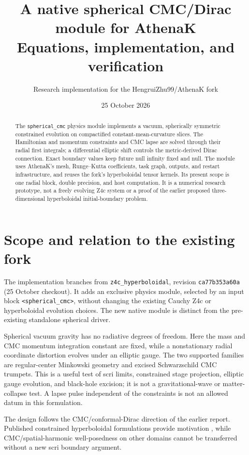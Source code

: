 \documentclass[11pt]{article}
\title{A native spherical CMC/Dirac module for AthenaK\\\large Equations, implementation, and verification}
\author{Research implementation for the HengruiZhu99/AthenaK fork}
\date{25 October 2026}
\begin{document}
\maketitle
\begin{abstract}
The \texttt{spherical\_cmc} physics module implements a vacuum, spherically
symmetric constrained evolution on compactified constant-mean-curvature slices.
The Hamiltonian and momentum constraints and CMC lapse are solved through their
radial first integrals; a differential elliptic shift controls the metric-derived
Dirac connection. Exact boundary values keep future null infinity fixed and null.
The module uses AthenaK's mesh, Runge--Kutta coefficients, task graph, outputs,
and restart infrastructure, and reuses the fork's hyperboloidal tensor kernels.
Its present scope is one radial block, double precision, and host computation.
It is a numerical research prototype, not a freely evolving Z4c system or a proof
of the earlier proposed three-dimensional hyperboloidal initial-boundary problem.
\end{abstract}

\section{Scope and relation to the existing fork}
The implementation branches from \texttt{z4c\_hyperboloidal}, revision
\texttt{ca77b353a60a} (25 October checkout). It adds an exclusive physics
module, selected by an input block \texttt{<spherical\_cmc>}, without changing
the existing Cauchy Z4c or hyperboloidal evolution choices. The new native module
is distinct from the pre-existing standalone spherical driver.

Spherical vacuum gravity has no radiative degrees of freedom. Here the mass
and CMC momentum integration constant are fixed, while a nonstationary radial
coordinate distortion evolves under an elliptic gauge. The two supported
families are regular-center Minkowski geometry and excised Schwarzschild CMC
trumpets. This is a useful test of scri limits, constrained stage projection,
elliptic gauge evolution, and black-hole excision; it is not a gravitational-wave
or matter-collapse test. A lapse pulse independent of the constraints is not
an allowed datum in this formulation.

The design follows the CMC/conformal-Dirac direction of the earlier report.
Published constrained hyperboloidal formulations provide motivation
\cite{moncrief,rinne}, while CMC/spatial-harmonic well-posedness on other domains
\cite{andersson} cannot be transferred without a new scri boundary argument.
\end{document}
